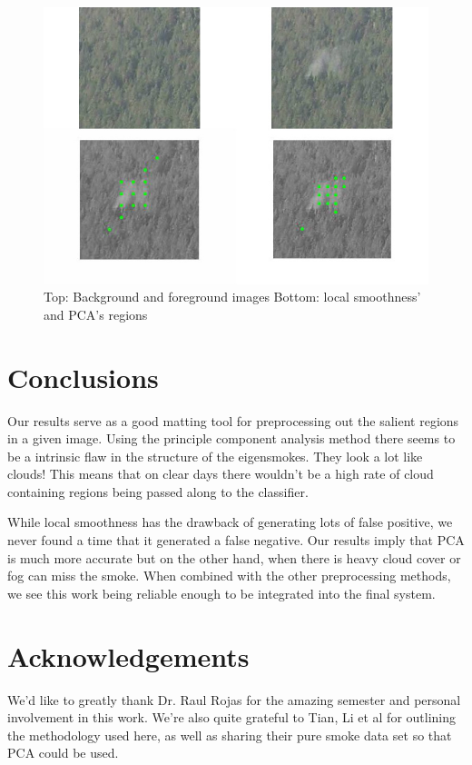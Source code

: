 \documentclass[12pt]{article}
\begin{document}
\begin{figure}[H]
\centering
\includegraphics[scale=.2]{combine_images.jpg}
\caption{\newline Top: Background and foreground images Bottom: local smoothness' and PCA's regions}
\end{figure}

\section{Conclusions}
Our results serve as a good matting tool for preprocessing out the salient regions in a given image. Using the principle component analysis method there seems to be a intrinsic flaw in the structure of the eigensmokes. They look a lot like clouds! This means that on clear days there wouldn't be a high rate of cloud containing regions being passed along to the classifier. 

While local smoothness has the drawback of generating lots of false positive, we never found a time that it generated a false negative. Our results imply that PCA is much more accurate but on the other hand, when there is heavy cloud cover or fog can miss the smoke. When combined with the other preprocessing methods, we see this work being reliable enough to be integrated into the final system. 

\section*{Acknowledgements}
We'd like to greatly thank Dr. Raul Rojas for the amazing semester and personal involvement in this work. We're also quite grateful to Tian, Li et al for outlining the methodology used here, as well as sharing their pure smoke data set so that PCA could be used.
\newpage



\end{document}
